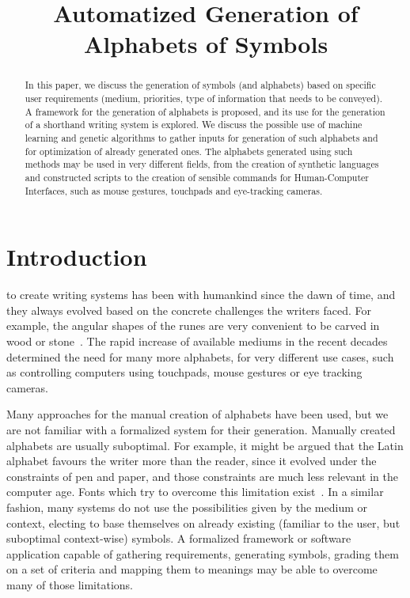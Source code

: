 \documentclass[conference]{IEEEtran}
\title{Automatized Generation of Alphabets of Symbols}
\author{
\IEEEauthorblockN{Serhii Hamotskyi}
\IEEEauthorblockA{
    Faculty of Informatics and Computer Technology \\
    Department of Computer Systems \\
    Igor Sykorsky Kyiv Polytechnic Institute \\
37, Prosp. Peremohy, Kyiv, Ukraine, 03056 \\
Email: shamotskyi@gmail.com}
}
\begin{document}
\maketitle              %

\begin{abstract}
In this paper, we discuss the generation of symbols (and alphabets) based on specific user requirements (medium, priorities, type of information that needs to be conveyed). A framework for the generation of alphabets is proposed, and its use for the generation of a shorthand writing system is explored. We discuss the possible use of machine learning and genetic algorithms to gather inputs for generation of such alphabets and for optimization of already generated ones. The alphabets generated using such methods may be used in very different fields, from the creation of synthetic languages and constructed scripts to the creation of sensible commands for Human-Computer Interfaces, such as mouse gestures, touchpads and eye-tracking cameras.
\end{abstract}

\section{Introduction}
%
\IEEEoverridecommandlockouts{} to create writing systems has been with humankind since the dawn of time, and they always evolved based on the concrete challenges the writers faced. For example, the angular shapes of the runes are very convenient to be carved in wood or stone~\cite{williams1996origin}. The rapid increase of available mediums in the recent decades determined the need for many more alphabets, for very different use cases, such as controlling computers using touchpads, mouse gestures or eye tracking cameras.

Many approaches for the manual creation of alphabets have been used, but we are not familiar with a formalized system for their generation. Manually created alphabets are usually suboptimal. For example, it might be argued that the Latin alphabet favours the writer more than the
reader, since it evolved under the constraints of pen and paper, and those constraints are much less relevant in the computer age. Fonts which try to overcome this limitation exist~\cite{dotsies}. In a similar fashion, many systems do not use the possibilities given by the medium or context, electing to base themselves on already existing (familiar to the user, but suboptimal context-wise) symbols. A formalized framework or software application capable of gathering requirements, generating symbols, grading them on a set of criteria and mapping them to meanings may be able to overcome many of those limitations.
\end{document}
